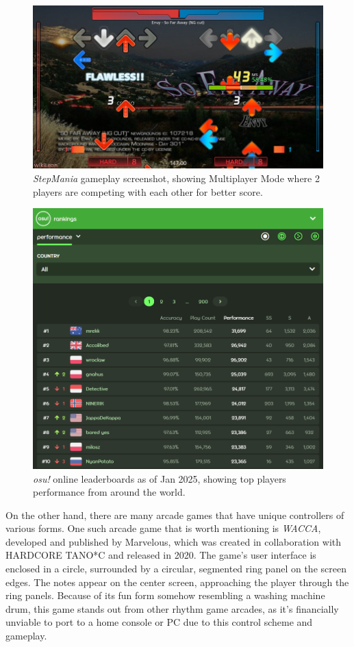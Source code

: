 \begin{figure}[h]
    \centering\includegraphics[scale=0.2]{obrazki/sm5multi.jpg}
    \caption{\textit{StepMania} gameplay screenshot, showing Multiplayer Mode where 2 players are competing with each other for better score. \cite{sm5multi}}
    \label{fig:sm5_multi}
\end{figure}
\pagebreak
\begin{figure}[h]
    \centering\includegraphics[scale=0.155]{obrazki/osuleaderboards.png}
    \caption{\textit{osu!} online leaderboards as of Jan 2025, showing top players performance from around the world. \cite{osuleaderboards}}
    \label{fig:osu_leaderboards}
\end{figure}
 
On the other hand, there are many arcade games that have unique controllers of various forms. 
One such arcade game that is worth mentioning is \textit{WACCA}, developed and published by Marvelous, which was created in collaboration with HARDCORE TANO*C and released in 2020. The game’s user interface is enclosed in a circle, surrounded by a circular, segmented ring panel on the screen edges. The notes appear on the center screen, approaching the player through the ring panels. Because of its fun form somehow resembling a washing machine drum, this game stands out from other rhythm game arcades, as it’s financially unviable to port to a home console or PC due to this control scheme and gameplay.

